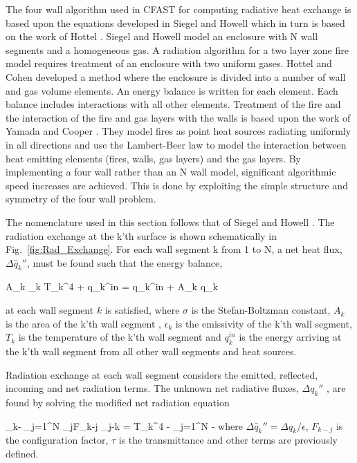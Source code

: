 The four wall algorithm used in CFAST for computing radiative heat exchange is based upon the equations developed in Siegel and Howell \cite{SiegelandHowell:1981} which in turn is based on the work of Hottel \cite{Hottel:1954}. Siegel and Howell model an enclosure with N wall segments and a homogeneous gas. A radiation algorithm for a two layer zone fire model requires treatment of an enclosure with two uniform gases.  Hottel and Cohen \cite{Hottel:1958} developed a method where the enclosure is divided into a number of wall and gas volume elements. An energy balance is written for each element. Each balance includes interactions with all other elements.  Treatment of the fire and the interaction of the fire and gas layers with the walls is based upon the work of Yamada and Cooper \cite{Yamada:1990}.  They model fires as point heat sources radiating uniformly in all directions and use the Lambert-Beer law to model the interaction between heat emitting elements (fires, walls, gas layers) and the gas layers. By implementing a four wall rather than an N wall model, significant algorithmic speed increases are achieved.  This is done by exploiting the simple structure and symmetry of the four wall problem.

The nomenclature used in this section follows that of Siegel and Howell \cite{SiegelandHowell:1981}.  The radiation exchange at the k'th surface is shown schematically in Fig.~\ref{fig:Rad_Exchange}.  For each wall segment k from 1 to N, a net heat flux, $\Delta \hat{q}_k\dprime$, must be found such that the energy balance,

\be \sigma A_k \epsilon_k T_k^4 + q_k^{in} = q_k^{in} + A_k \Delta q_k\dprime \ee

at each wall segment $k$ is satisfied, where $\sigma$ is the Stefan-Boltzman constant, $A_k$ is the area of the k'th wall segment , $\epsilon_k$ is the emissivity of the k'th wall segment, $T_k$ is the temperature of the k'th wall segment and $q_k^{in}$ is the energy arriving at the k'th wall segment from all other wall segments and heat sources.

Radiation exchange at each wall segment considers the emitted, reflected, incoming and net radiation terms.  The unknown net radiative fluxes, $\Delta q_k\dprime$ , are found by solving the modified net radiation equation

\be \Delta {}_k\dprime - \displaystyle\sum_{j=1}^N  \Delta {}_j\dprime F_{k-j} \tau_{j-k} = \sigma T_k^4 - \displaystyle\sum_{j=1}^N  -  \ee
where $\Delta \hat{q}_k\dprime = \Delta q_k / \epsilon$, $F_{k-j}$ is the configuration factor, $\tau$ is the transmittance and other terms are previously defined.

